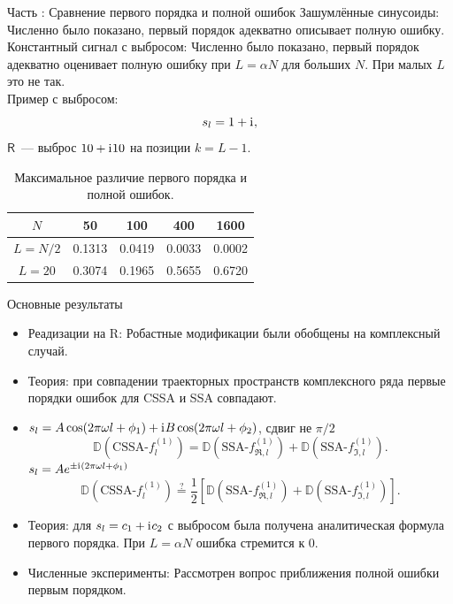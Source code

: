 \documentclass[10pt, ucs, notheorems, handout]{beamer}
\newcommand{\tX}[1]{\mathsf{#1}}
\newcommand{\iu}{\mathrm{i}\mkern1mu}
\newcommand{\RomanNumeralCaps}[1]
{\MakeUppercase{\romannumeral #1}}
\begin{document}
\begin{frame}{Часть \RomanNumeralCaps{2}: Сравнение первого порядка и полной ошибок}
\alert{Зашумлённые синусоиды:} Численно было показано, первый порядок адекватно описывает полную ошибку.\\
\vspace{1em}
\alert{Константный сигнал с выбросом:} Численно было показано, первый порядок адекватно оценивает полную ошибку при $L = \alpha N$ для больших $N$. При малых $L$ это не так.\\
\vspace{1em}
\alert{Пример с выбросом:}
$$s_l = 1 + \iu,$$
$\tX{R}$~--- выброс $10 + \iu 10$ на позиции $k = L - 1$.

\begin{table}[H]
	\begin{center}
		\caption{Максимальное различие первого порядка и полной ошибок.}
		\label{tab:const_outl}
		\begin{tabular}{|c|c|c|c|c|}
			\hline
			$N$	& 50 & 100 & 400 & 1600 \\
			\hline
			$L = N / 2$ & 0.1313  & 0.0419  & 0.0033 & 0.0002 \\
			\hline
			$L = 20$ & 0.3074  & 0.1965  & 0.5655 & 0.6720 \\
			\hline
		\end{tabular}
	\end{center}
\end{table}

\end{frame}


\begin{frame}{Основные результаты}
    \begin{itemize}
    	\item \alert{Реадизации на R:} Робастные модификации были обобщены на комплексный случай.
        \item \alert{Теория:} при совпадении траекторных пространств комплексного ряда первые порядки ошибок для CSSA и SSA совпадают.
        \item $s_l = A\cos(2 \pi\omega l + \phi_1) + \iu B\cos(2 \pi\omega l + \phi_2)$, сдвиг не $\pi / 2$
        $$\mathbb{D}(\text{CSSA-}f^{(1)}_l) = \mathbb{D}(\text{SSA-}f^{(1)}_{\Re, l}) + \mathbb{D}(\text{SSA-}f^{(1)}_{\Im, l}).$$
        $s_l = Ae^{\pm \iu(2 \pi\omega l + \phi_1)}$
        $$\mathbb{D}(\text{CSSA-}f^{(1)}_l) \stackrel{?}{=} \frac{1}{2}[\mathbb{D}(\text{SSA-}f^{(1)}_{\Re, l}) + \mathbb{D}(\text{SSA-}f^{(1)}_{\Im, l})].$$
        \item \alert{Теория:} для $s_l = c_1 + \iu c_2$ с выбросом была получена аналитическая формула первого порядка. При $L = \alpha N$ ошибка стремится к $0$.
        \item \alert{Численные эксперименты:} Рассмотрен вопрос приближения полной ошибки первым порядком.
    \end{itemize}
\end{frame}
\end{document}
